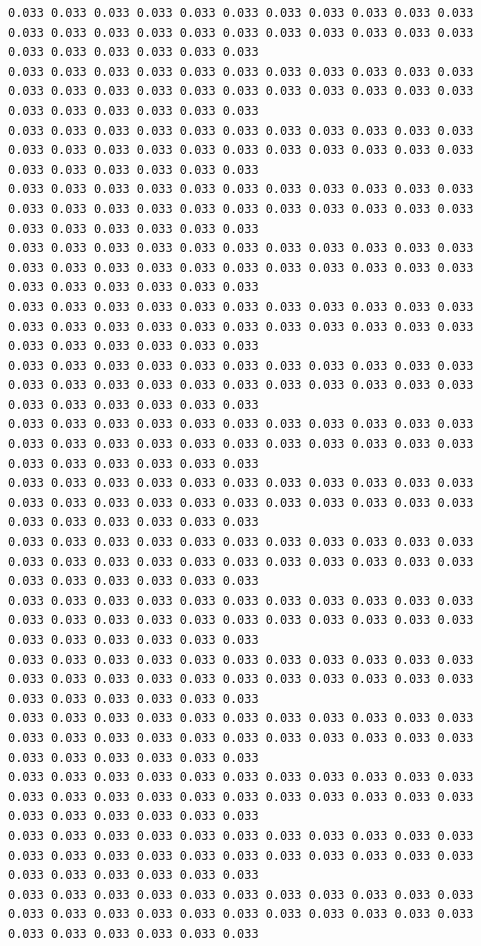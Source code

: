 \begin{lstlisting}[caption= Input file for 4 well example , label=lst:wellfield]
0.033 0.033 0.033 0.033 0.033 0.033 0.033 0.033 0.033 0.033 0.033 0.033 0.033 0.033 0.033 0.033 0.033 0.033 0.033 0.033 0.033 0.033 0.033 0.033 0.033 0.033 0.033 0.033
0.033 0.033 0.033 0.033 0.033 0.033 0.033 0.033 0.033 0.033 0.033 0.033 0.033 0.033 0.033 0.033 0.033 0.033 0.033 0.033 0.033 0.033 0.033 0.033 0.033 0.033 0.033 0.033
0.033 0.033 0.033 0.033 0.033 0.033 0.033 0.033 0.033 0.033 0.033 0.033 0.033 0.033 0.033 0.033 0.033 0.033 0.033 0.033 0.033 0.033 0.033 0.033 0.033 0.033 0.033 0.033
0.033 0.033 0.033 0.033 0.033 0.033 0.033 0.033 0.033 0.033 0.033 0.033 0.033 0.033 0.033 0.033 0.033 0.033 0.033 0.033 0.033 0.033 0.033 0.033 0.033 0.033 0.033 0.033
0.033 0.033 0.033 0.033 0.033 0.033 0.033 0.033 0.033 0.033 0.033 0.033 0.033 0.033 0.033 0.033 0.033 0.033 0.033 0.033 0.033 0.033 0.033 0.033 0.033 0.033 0.033 0.033
0.033 0.033 0.033 0.033 0.033 0.033 0.033 0.033 0.033 0.033 0.033 0.033 0.033 0.033 0.033 0.033 0.033 0.033 0.033 0.033 0.033 0.033 0.033 0.033 0.033 0.033 0.033 0.033
0.033 0.033 0.033 0.033 0.033 0.033 0.033 0.033 0.033 0.033 0.033 0.033 0.033 0.033 0.033 0.033 0.033 0.033 0.033 0.033 0.033 0.033 0.033 0.033 0.033 0.033 0.033 0.033
0.033 0.033 0.033 0.033 0.033 0.033 0.033 0.033 0.033 0.033 0.033 0.033 0.033 0.033 0.033 0.033 0.033 0.033 0.033 0.033 0.033 0.033 0.033 0.033 0.033 0.033 0.033 0.033
0.033 0.033 0.033 0.033 0.033 0.033 0.033 0.033 0.033 0.033 0.033 0.033 0.033 0.033 0.033 0.033 0.033 0.033 0.033 0.033 0.033 0.033 0.033 0.033 0.033 0.033 0.033 0.033
0.033 0.033 0.033 0.033 0.033 0.033 0.033 0.033 0.033 0.033 0.033 0.033 0.033 0.033 0.033 0.033 0.033 0.033 0.033 0.033 0.033 0.033 0.033 0.033 0.033 0.033 0.033 0.033
0.033 0.033 0.033 0.033 0.033 0.033 0.033 0.033 0.033 0.033 0.033 0.033 0.033 0.033 0.033 0.033 0.033 0.033 0.033 0.033 0.033 0.033 0.033 0.033 0.033 0.033 0.033 0.033
0.033 0.033 0.033 0.033 0.033 0.033 0.033 0.033 0.033 0.033 0.033 0.033 0.033 0.033 0.033 0.033 0.033 0.033 0.033 0.033 0.033 0.033 0.033 0.033 0.033 0.033 0.033 0.033
0.033 0.033 0.033 0.033 0.033 0.033 0.033 0.033 0.033 0.033 0.033 0.033 0.033 0.033 0.033 0.033 0.033 0.033 0.033 0.033 0.033 0.033 0.033 0.033 0.033 0.033 0.033 0.033
0.033 0.033 0.033 0.033 0.033 0.033 0.033 0.033 0.033 0.033 0.033 0.033 0.033 0.033 0.033 0.033 0.033 0.033 0.033 0.033 0.033 0.033 0.033 0.033 0.033 0.033 0.033 0.033
0.033 0.033 0.033 0.033 0.033 0.033 0.033 0.033 0.033 0.033 0.033 0.033 0.033 0.033 0.033 0.033 0.033 0.033 0.033 0.033 0.033 0.033 0.033 0.033 0.033 0.033 0.033 0.033
0.033 0.033 0.033 0.033 0.033 0.033 0.033 0.033 0.033 0.033 0.033 0.033 0.033 0.033 0.033 0.033 0.033 0.033 0.033 0.033 0.033 0.033 0.033 0.033 0.033 0.033 0.033 0.033

\end{lstlisting}
